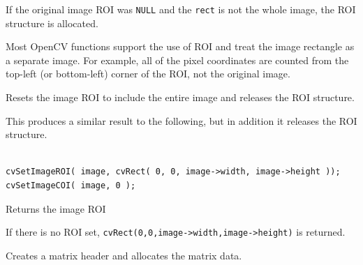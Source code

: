 If the original image ROI was \texttt{NULL} and the \texttt{rect} is not the whole image, the ROI structure is allocated.

Most OpenCV functions support the use of ROI and treat the image rectangle as a separate image. For example, all of the pixel coordinates are counted from the top-left (or bottom-left) corner of the ROI, not the original image.

\label{ResetImageROI}

Resets the image ROI to include the entire image and releases the ROI structure.


\begin{description}
\end{description}

This produces a similar result to the following, but in addition it releases the ROI structure.

\begin{lstlisting}

cvSetImageROI( image, cvRect( 0, 0, image->width, image->height ));
cvSetImageCOI( image, 0 );

\end{lstlisting}


\label{GetImageROI}

Returns the image ROI


\begin{description}
\end{description}


If there is no ROI set, \texttt{cvRect(0,0,image->width,image->height)} is returned.


\label{CreateMat}

Creates a matrix header and allocates the matrix data. 


